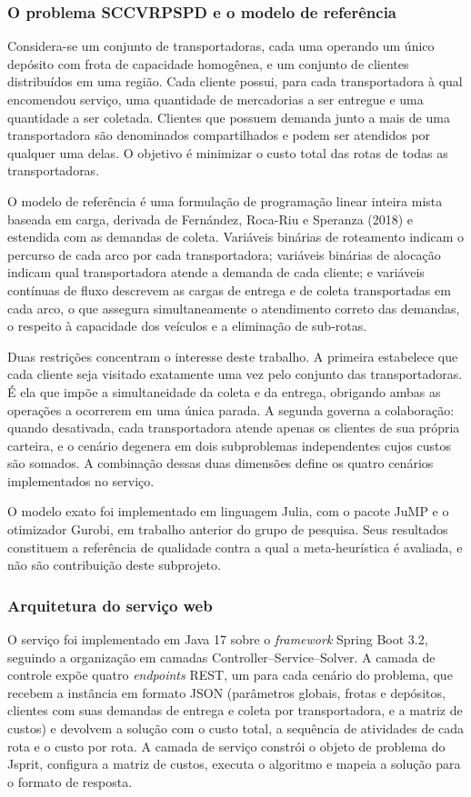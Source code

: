 \documentclass[a4paper,12pt]{article}
\begin{document}
\subsubsection{O problema SCCVRPSPD e o modelo de referência}
Considera-se um conjunto de transportadoras, cada uma operando um único depósito com frota de capacidade homogênea, e um conjunto de clientes distribuídos em uma região. Cada cliente possui, para cada transportadora à qual encomendou serviço, uma quantidade de mercadorias a ser entregue e uma quantidade a ser coletada. Clientes que possuem demanda junto a mais de uma transportadora são denominados compartilhados e podem ser atendidos por qualquer uma delas. O objetivo é minimizar o custo total das rotas de todas as transportadoras.

O modelo de referência é uma formulação de programação linear inteira mista baseada em carga, derivada de Fernández, Roca-Riu e Speranza (2018) e estendida com as demandas de coleta. Variáveis binárias de roteamento indicam o percurso de cada arco por cada transportadora; variáveis binárias de alocação indicam qual transportadora atende a demanda de cada cliente; e variáveis contínuas de fluxo descrevem as cargas de entrega e de coleta transportadas em cada arco, o que assegura simultaneamente o atendimento correto das demandas, o respeito à capacidade dos veículos e a eliminação de sub-rotas.

Duas restrições concentram o interesse deste trabalho. A primeira estabelece que cada cliente seja visitado exatamente uma vez pelo conjunto das transportadoras. É ela que impõe a simultaneidade da coleta e da entrega, obrigando ambas as operações a ocorrerem em uma única parada. A segunda governa a colaboração: quando desativada, cada transportadora atende apenas os clientes de sua própria carteira, e o cenário degenera em dois subproblemas independentes cujos custos são somados. A combinação dessas duas dimensões define os quatro cenários implementados no serviço.

O modelo exato foi implementado em linguagem Julia, com o pacote JuMP e o otimizador Gurobi, em trabalho anterior do grupo de pesquisa. Seus resultados constituem a referência de qualidade contra a qual a meta-heurística é avaliada, e não são contribuição deste subprojeto.

\subsubsection{Arquitetura do serviço web}
O serviço foi implementado em Java 17 sobre o \textit{framework} Spring Boot 3.2, seguindo a organização em camadas Controller--Service--Solver. A camada de controle expõe quatro \textit{endpoints} REST, um para cada cenário do problema, que recebem a instância em formato JSON (parâmetros globais, frotas e depósitos, clientes com suas demandas de entrega e coleta por transportadora, e a matriz de custos) e devolvem a solução com o custo total, a sequência de atividades de cada rota e o custo por rota. A camada de serviço constrói o objeto de problema do Jsprit, configura a matriz de custos, executa o algoritmo e mapeia a solução para o formato de resposta.
\end{document}
